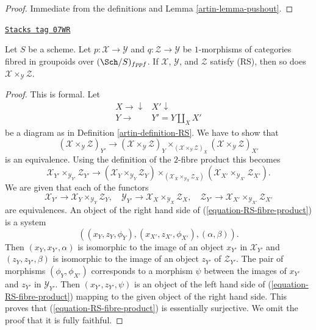 \begin{proof}

Immediate from the definitions and Lemma \ref{artin-lemma-pushout}.
\end{proof}

\begin{lemma}
\label{artin-lemma-fibre-product-RS}
\href{https://stacks.math.columbia.edu/tag/07WR}{\texttt{Stacks tag 07WR}}

Let $S$ be a scheme. Let $p : \mathcal{X} \to \mathcal{Y}$ and
$q : \mathcal{Z} \to \mathcal{Y}$ be $1$-morphisms of categories
fibred in groupoids over $(\Sch/S)_{fppf}$. If $\mathcal{X}$, $\mathcal{Y}$,
and $\mathcal{Z}$ satisfy (RS), then so
does $\mathcal{X} \times_\mathcal{Y} \mathcal{Z}$.
\end{lemma}

\begin{proof}

This is formal. Let
$$
\begin{array}{cc}X \longrightarrow\downarrow & X' \downarrow \\ Y \longrightarrow & Y' = Y \amalg_X X'\end{array}
$$
be a diagram as in Definition \ref{artin-definition-RS}. We have to show that
$$
(\mathcal{X} \times_{\mathcal{Y}} \mathcal{Z})_{Y'}
\longrightarrow
(\mathcal{X} \times_{\mathcal{Y}} \mathcal{Z})_Y
\times_{(\mathcal{X} \times_{\mathcal{Y}} \mathcal{Z})_X}
(\mathcal{X} \times_{\mathcal{Y}} \mathcal{Z})_{X'}
$$
is an equivalence. Using the definition of the $2$-fibre product
this becomes
\begin{equation}
\label{equation-RS-fibre-product}
\mathcal{X}_{Y'} \times_{\mathcal{Y}_{Y'}} \mathcal{Z}_{Y'}
\longrightarrow
(\mathcal{X}_Y \times_{\mathcal{Y}_Y} \mathcal{Z}_Y)
\times_{(\mathcal{X}_X \times_{\mathcal{Y}_X} \mathcal{Z}_X)}
(\mathcal{X}_{X'} \times_{\mathcal{Y}_{X'}} \mathcal{Z}_{X'}).
\end{equation}
We are given that each of the functors
$$
\mathcal{X}_{Y'} \to \mathcal{X}_Y \times_{\mathcal{Y}_Y} \mathcal{Z}_Y,
\quad
\mathcal{Y}_{Y'} \to \mathcal{X}_X \times_{\mathcal{Y}_X} \mathcal{Z}_X,
\quad
\mathcal{Z}_{Y'} \to
\mathcal{X}_{X'} \times_{\mathcal{Y}_{X'}} \mathcal{Z}_{X'}
$$
are equivalences. An object of the right hand side of
(\ref{equation-RS-fibre-product}) is a system
$$
((x_Y, z_Y, \phi_Y), (x_{X'}, z_{X'}, \phi_{X'}), (\alpha, \beta)).
$$
Then $(x_Y, x_{Y'}, \alpha)$ is isomorphic to the image of an object
$x_{Y'}$ in $\mathcal{X}_{Y'}$ and $(z_Y, z_{Y'}, \beta)$ is isomorphic
to the image of an object $z_{Y'}$ of $\mathcal{Z}_{Y'}$. The pair of
morphisms $(\phi_Y, \phi_{X'})$ corresponds to a morphism $\psi$
between the images of $x_{Y'}$ and $z_{Y'}$ in $\mathcal{Y}_{Y'}$.
Then $(x_{Y'}, z_{Y'}, \psi)$ is an object of the left hand side of
(\ref{equation-RS-fibre-product}) mapping to the given object of the
right hand side. This proves that (\ref{equation-RS-fibre-product}) is
essentially surjective. We omit the proof that it is fully faithful.
\end{proof}

